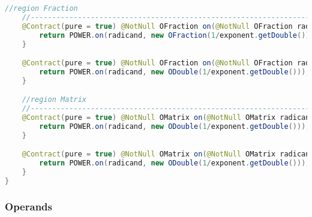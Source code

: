 \begin{lstlisting}[caption=Root (Istogu),label=list:Root,language=Java]
    //region Fraction
    //------------------------------------------------------------------------------------
    @Contract(pure = true) @NotNull OFraction on(@NotNull OFraction radicand, @NotNull ODouble exponent){
        return POWER.on(radicand, new OFraction(1/exponent.getDouble()));
    }

    @Contract(pure = true) @NotNull OFraction on(@NotNull OFraction radicand, @NotNull OFraction exponent){
        return POWER.on(radicand, new ODouble(1/exponent.getDouble()));
    }

    //region Matrix
    //------------------------------------------------------------------------------------
    @Contract(pure = true) @NotNull OMatrix on(@NotNull OMatrix radicand, @NotNull ODouble exponent) {
        return POWER.on(radicand, new ODouble(1/exponent.getDouble()));
    }

    @Contract(pure = true) @NotNull OMatrix on(@NotNull OMatrix radicand, @NotNull OFraction exponent) {
        return POWER.on(radicand, new ODouble(1/exponent.getDouble()));
    }
}

\end{lstlisting}    

\subsubsection{Operands}

